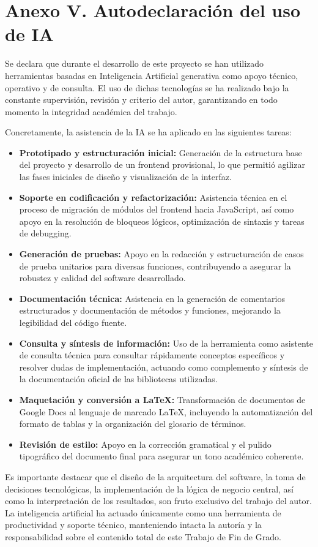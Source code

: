 \section*{Anexo V. Autodeclaración del uso de IA}
Se declara que durante el desarrollo de este proyecto se han utilizado herramientas basadas en Inteligencia Artificial generativa como apoyo técnico, operativo y de consulta. El uso de dichas tecnologías se ha realizado bajo la constante supervisión, revisión y criterio del autor, garantizando en todo momento la integridad académica del trabajo.

Concretamente, la asistencia de la IA se ha aplicado en las siguientes tareas:
\begin{itemize}
    \item \textbf{Prototipado y estructuración inicial:} Generación de la estructura base del proyecto y desarrollo de un frontend provisional, lo que permitió agilizar las fases iniciales de diseño y visualización de la interfaz.
    \item \textbf{Soporte en codificación y refactorización:} Asistencia técnica en el proceso de migración de módulos del frontend hacia JavaScript, así como apoyo en la resolución de bloqueos lógicos, optimización de sintaxis y tareas de debugging.
    \item \textbf{Generación de pruebas:} Apoyo en la redacción y estructuración de casos de prueba unitarios para diversas funciones, contribuyendo a asegurar la robustez y calidad del software desarrollado.
    \item \textbf{Documentación técnica:} Asistencia en la generación de comentarios estructurados y documentación de métodos y funciones, mejorando la legibilidad del código fuente.
    \item \textbf{Consulta y síntesis de información:} Uso de la herramienta como asistente de consulta técnica para consultar rápidamente conceptos específicos y resolver dudas de implementación, actuando como complemento y síntesis de la documentación oficial de las bibliotecas utilizadas.
    \item \textbf{Maquetación y conversión a LaTeX:} Transformación de documentos de Google Docs al lenguaje de marcado \LaTeX, incluyendo la automatización del formato de tablas y la organización del glosario de términos.
    \item \textbf{Revisión de estilo:} Apoyo en la corrección gramatical y el pulido tipográfico del documento final para asegurar un tono académico coherente.
\end{itemize}

Es importante destacar que el diseño de la arquitectura del software, la toma de decisiones tecnológicas, la implementación de la lógica de negocio central, así
 como la interpretación de los resultados, son fruto exclusivo del trabajo del autor. La inteligencia artificial ha actuado únicamente
  como una herramienta de productividad y soporte técnico, manteniendo intacta la autoría y la responsabilidad sobre el contenido total de este Trabajo de Fin de Grado.